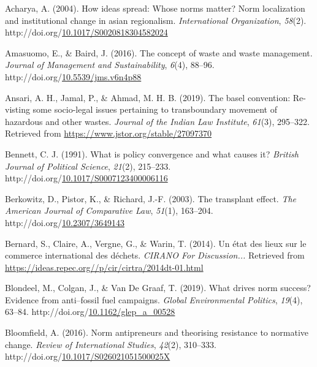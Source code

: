 \documentclass[12pt]{ulaval}
\newenvironment{CSLReferences}%
  {}%
  {\par}
\begin{document}
\label{refs}
\begin{CSLReferences}{1}{0}
Acharya, A. (2004). How ideas spread: Whose norms matter? Norm localization and institutional change in asian regionalism. \emph{International Organization}, \emph{58}(2). http://doi.org/\href{https://doi.org/10.1017/S0020818304582024}{10.1017/S0020818304582024}

Amasuomo, E., \& Baird, J. (2016). The concept of waste and waste management. \emph{Journal of Management and Sustainability}, \emph{6}(4), 88--96. http://doi.org/\href{https://doi.org/10.5539/jms.v6n4p88}{10.5539/jms.v6n4p88}

Ansari, A. H., Jamal, P., \& Ahmad, M. H. B. (2019). The basel convention: Re-visting some socio-legal issues pertaining to transboundary movement of hazardous and other wastes. \emph{Journal of the Indian Law Institute}, \emph{61}(3), 295--322. Retrieved from \url{https://www.jstor.org/stable/27097370}

Bennett, C. J. (1991). What is policy convergence and what causes it? \emph{British Journal of Political Science}, \emph{21}(2), 215--233. http://doi.org/\href{https://doi.org/10.1017/S0007123400006116}{10.1017/S0007123400006116}

Berkowitz, D., Pistor, K., \& Richard, J.-F. (2003). The transplant effect. \emph{The American Journal of Comparative Law}, \emph{51}(1), 163--204. http://doi.org/\href{https://doi.org/10.2307/3649143}{10.2307/3649143}

Bernard, S., Claire, A., Vergne, G., \& Warin, T. (2014). Un état des lieux sur le commerce international des déchets. \emph{{CIRANO} For Discussion...} Retrieved from \url{https://ideas.repec.org//p/cir/cirtra/2014dt-01.html}

Blondeel, M., Colgan, J., \& Van De Graaf, T. (2019). What drives norm success? Evidence from anti--fossil fuel campaigns. \emph{Global Environmental Politics}, \emph{19}(4), 63--84. http://doi.org/\href{https://doi.org/10.1162/glep_a_00528}{10.1162/glep\_a\_00528}

Bloomfield, A. (2016). Norm antipreneurs and theorising resistance to normative change. \emph{Review of International Studies}, \emph{42}(2), 310--333. http://doi.org/\href{https://doi.org/10.1017/S026021051500025X}{10.1017/S026021051500025X}


\end{CSLReferences}
\end{document}
